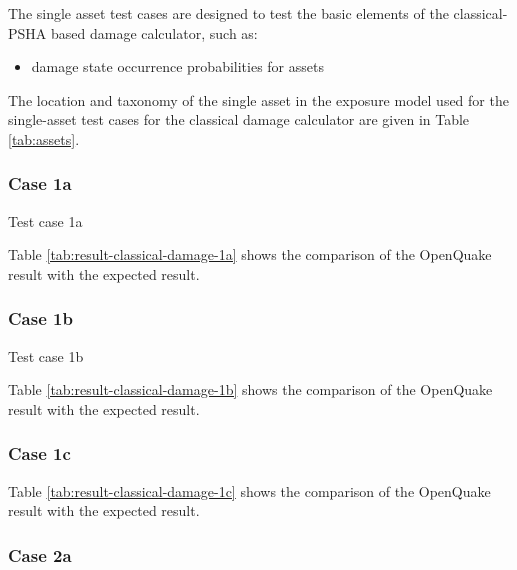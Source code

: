 The single asset test cases are designed to test the basic elements of the classical-PSHA based damage calculator, such as:

\begin{itemize}
\item damage state occurrence probabilities for assets
\end{itemize}

The location and taxonomy of the single asset in the exposure model used for the single-asset test cases for the classical damage calculator are given in Table \ref{tab:assets}.


\subsubsection{Case 1a}
Test case 1a 



Table \ref{tab:result-classical-damage-1a} shows the comparison of the OpenQuake result with the expected result.

\subsubsection{Case 1b}
Test case 1b 



Table \ref{tab:result-classical-damage-1b} shows the comparison of the OpenQuake result with the expected result.

\subsubsection{Case 1c}




Table \ref{tab:result-classical-damage-1c} shows the comparison of the OpenQuake result with the expected result.

\subsubsection{Case 2a}



